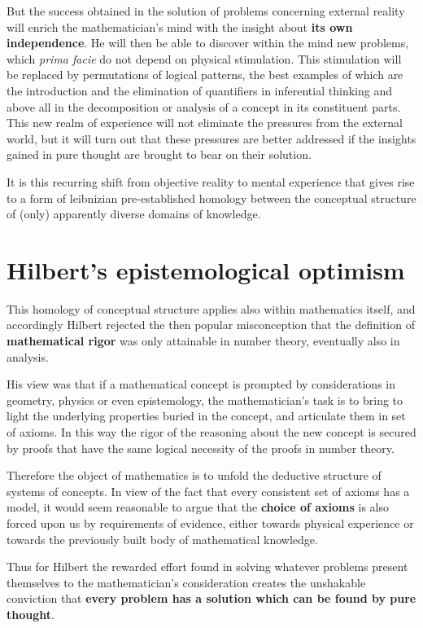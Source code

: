 \documentclass[12pt]{article}
\begin{document}
But the success obtained in the solution of problems concerning external reality will enrich the mathematician's mind with the insight about \textbf{its own independence}. He will then be able to discover within the mind new problems, which \emph{prima facie} do not depend on physical stimulation. This stimulation will be replaced by permutations of logical patterns, the best examples of which are the introduction and the elimination of quantifiers in inferential thinking and above all in the decomposition or analysis of a concept in its constituent parts. This new realm of experience will not eliminate the pressures from the external world, but it will turn out that these pressures are better addressed if the insights gained in pure thought are brought to bear on their solution.

It is this recurring shift from objective reality to mental experience that gives rise to a form of leibnizian pre-established homology between the conceptual structure of (only) apparently diverse domains of knowledge. 

\section{Hilbert's epistemological optimism}\normalsize

This homology of conceptual structure applies also within mathematics itself, and accordingly Hilbert rejected the then popular misconception that the definition of \textbf{mathematical rigor} was only attainable in number theory, eventually also in analysis.

His view was that if a mathematical concept is prompted by considerations in geometry, physics or even epistemology, the mathematician's task is to bring to light the underlying properties buried in the concept, and articulate them in  set of axioms. In this way the rigor of the reasoning about the new concept is secured by proofs that have the same logical necessity of the proofs in number theory.

Therefore the object of mathematics is to unfold the deductive structure of systems of concepts. In view of the fact that every consistent set of axioms has a model, it would seem reasonable to argue that the \textbf{choice of axioms} is also  forced upon us by requirements of evidence, either towards physical experience or towards the previously built body of mathematical knowledge.

Thus for Hilbert the rewarded effort found in solving whatever problems present themselves to the mathematician's  consideration creates the unshakable conviction that \textbf{every problem has a solution which can be found by pure thought}.
\end{document}
